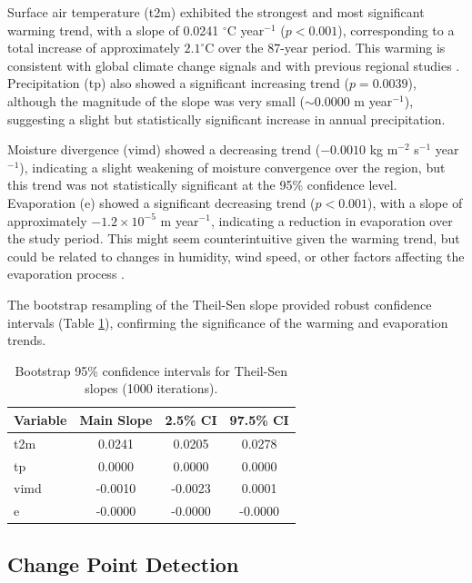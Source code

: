 \documentclass[12pt,a4paper]{article}
\begin{document}
Surface air temperature (t2m) exhibited the strongest and most significant warming trend, with a slope of 0.0241 $^\circ$C year$^{-1}$ ($p < 0.001$), corresponding to a total increase of approximately $2.1^\circ$C over the 87-year period. This warming is consistent with global climate change signals and with previous regional studies \citep{shevchenko2017}. Precipitation (tp) also showed a significant increasing trend ($p = 0.0039$), although the magnitude of the slope was very small ($\sim 0.0000$ m year$^{-1}$), suggesting a slight but statistically significant increase in annual precipitation.

Moisture divergence (vimd) showed a decreasing trend ($-0.0010$ kg m$^{-2}$ s$^{-1}$ year$^{-1}$), indicating a slight weakening of moisture convergence over the region, but this trend was not statistically significant at the 95\% confidence level. Evaporation (e) showed a significant decreasing trend ($p < 0.001$), with a slope of approximately $-1.2 \times 10^{-5}$ m year$^{-1}$, indicating a reduction in evaporation over the study period. This might seem counterintuitive given the warming trend, but could be related to changes in humidity, wind speed, or other factors affecting the evaporation process \citep{donohue2010}.

The bootstrap resampling of the Theil-Sen slope provided robust confidence intervals (Table \ref{tab:bootstrap}), confirming the significance of the warming and evaporation trends.

\begin{table}[H]
\centering
\caption{Bootstrap 95\% confidence intervals for Theil-Sen slopes (1000 iterations).}
\label{tab:bootstrap}
\begin{tabular}{l c c c}
\toprule
\textbf{Variable} & \textbf{Main Slope} & \textbf{2.5\% CI} & \textbf{97.5\% CI} \\
\midrule
t2m & 0.0241 & 0.0205 & 0.0278 \\
tp & 0.0000 & 0.0000 & 0.0000 \\
vimd & -0.0010 & -0.0023 & 0.0001 \\
e & -0.0000 & -0.0000 & -0.0000 \\
\bottomrule
\end{tabular}
\end{table}

\subsection{Change Point Detection}
\end{document}
